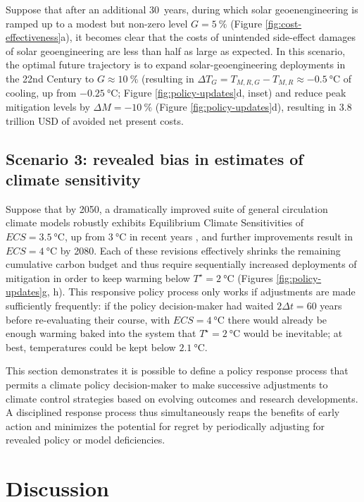 \documentclass[9pt,twocolumn,twoside,lineno]{pnas-new}
\begin{document}
Suppose that after an additional \SI{30}{years}, during which solar geoenengineering is ramped up to a modest but non-zero level $G=\SI{5}{\%}$ (Figure \ref{fig:cost-effectiveness}a), it becomes clear that the costs of unintended side-effect damages of solar geoengineering are less than half as large as expected. In this scenario, the optimal future trajectory is to expand solar-geoengineering deployments in the 22nd Century to $G \approx \SI{10}{\%}$ (resulting in $\Delta T_{G} = T_{M,R,G} - T_{M,R} \approx \SI{-0.5}{\celsius}$ of cooling, up from $\SI{-0.25}{\celsius}$; Figure \ref{fig:policy-updates}d, inset) and reduce peak mitigation levels by $\Delta M = \SI{-10}{\%}$ (Figure \ref{fig:policy-updates}d), resulting in $3.8$ trillion USD of avoided net present costs.

\subsection*{Scenario 3: revealed bias in estimates of climate sensitivity}

Suppose that by 2050, a dramatically improved suite of general circulation climate models robustly exhibits Equilibrium Climate Sensitivities of $ECS=\SI{3.5}{\celsius}$, up from $\SI{3}{\celsius}$ in recent years \citep{geoffroy_transient_2012}, and further improvements result in $ECS=\SI{4}{\celsius}$ by 2080. Each of these revisions effectively shrinks the remaining cumulative carbon budget and thus require sequentially increased deployments of mitigation in order to keep warming below $T^{\star} = \SI{2}{\celsius}$ (Figures \ref{fig:policy-updates}g, h). This responsive policy process only works if adjustments are made sufficiently frequently: if the policy decision-maker had waited $2\Delta t = 60$ years before re-evaluating their course, with $ECS=\SI{4}{\celsius}$ there would already be enough warming baked into the system that $T^{\star} = \SI{2}{\celsius}$ would be inevitable; at best, temperatures could be kept below $\SI{2.1}{\celsius}$.

This section demonstrates it is possible to define a policy response process that permits a climate policy decision-maker to make successive adjustments to climate control strategies based on evolving outcomes and research developments. A disciplined response process thus simultaneously reaps the benefits of early action and minimizes the potential for regret by periodically adjusting for revealed policy or model deficiencies.

\section*{Discussion}
\end{document}
